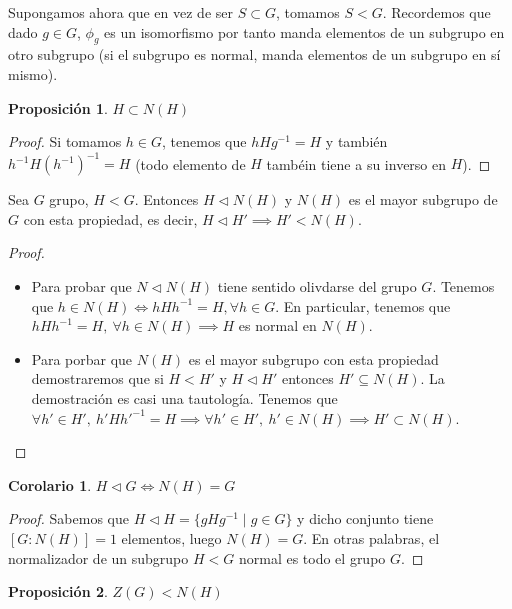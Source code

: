 \documentclass{book}
\newtheorem*{cor}{Corolario}
\newtheorem{pro}{Proposición}
\theoremstyle{definition}
\theoremstyle{remark}
\newcommand{\normsub}{\mathbin{\triangleleft}}
\newcommand{\inv}[1]{#1^{-1}}
\begin{document}
Supongamos ahora que en vez de ser $S \subset G$, tomamos $S < G$. Recordemos que dado $g\in G$, $\phi_g$ es un isomorfismo por tanto manda elementos de un subgrupo en otro subgrupo (si el subgrupo es normal, manda elementos de un subgrupo en sí mismo).

\begin{pro}
	$H \subset N(H)$
\end{pro}

\begin{proof}
	Si tomamos $h \in G$, tenemos que $hH\inv{g} = H$ y también $\inv{h}H\inv{(\inv{h})} = H$ (todo elemento de $H$ tambéin tiene a su inverso en $H$).
\end{proof}

\begin{thm}
	Sea $G$ grupo, $H < G$. Entonces $H \normsub N(H)$ y $N(H)$ es el mayor subgrupo de $G$ con esta propiedad, es decir, $H \normsub H' \implies H' < N(H)$.
\end{thm}

\begin{proof}$ $\newline
	\begin{itemize}
		\item Para probar que $N\normsub N(H)$ tiene sentido olivdarse del grupo $G$. Tenemos que $h \in N(H) \iff hH\inv{h} = H, \forall h \in G$. En particular, tenemos que $hH\inv{h} = H,\ \forall h \in N(H) \implies H$ es normal en $N(H)$.
		
		\item Para porbar que $N(H)$ es el mayor subgrupo con esta propiedad demostraremos que si $H < H'$ y $H \normsub H'$ entonces $H' \subseteq N(H)$. La demostración es casi una tautología. Tenemos que $\forall h' \in H',\ h'H\inv{h'} = H \implies \forall h' \in H',\ h' \in N(H) \implies H' \subset N(H)$.
	\end{itemize}
\end{proof}

\begin{cor}
	$H \normsub G \iff N(H) = G$
\end{cor}

\begin{proof}
	Sabemos que $H\normsub H = \{gH\inv{g} \mid g \in G\}$ y dicho conjunto tiene $[G:N(H)] = 1$ elementos, luego $N(H) = G$. En otras palabras, el normalizador de un subgrupo $H < G$ normal es todo el grupo $G$.
\end{proof}

\begin{pro}
	$Z(G) < N(H)$
\end{pro}
\end{document}
